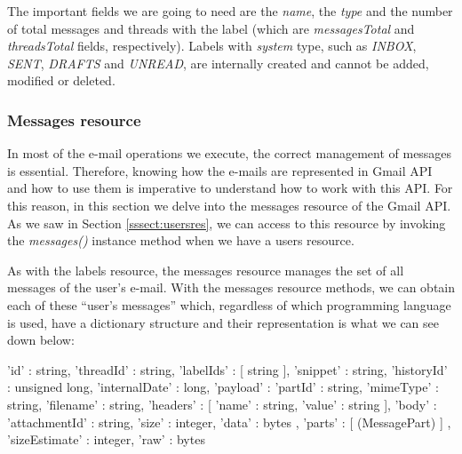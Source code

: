 The important fields we are going to need are the \textit{name}, the \textit{type} and the number of total messages and threads with the label (which are \textit{messagesTotal} and \textit{threadsTotal} fields, respectively). Labels with \textit{system} type, such as \textit{INBOX}, \textit{SENT}, \textit{DRAFTS} and \textit{UNREAD}, are internally created and cannot be added, modified or deleted.

\subsubsection{Messages resource}\label{sssect:msgres}
In most of the e-mail operations we execute, the correct management of messages is essential. Therefore, knowing how the e-mails are represented in Gmail API and how to use them is imperative to understand how to work with this API. For this reason, in this section we  delve into the messages resource \citep[/v1/reference/users/messages]{gmailAPI} of the Gmail API. As we saw in Section \ref{sssect:usersres}, we can access to this resource by invoking the \textit{messages()} instance method when we have a users resource.

As with the labels resource, the messages resource manages the set of all messages of the user's e-mail. With the messages resource methods, we can obtain each of these ``user's messages'' which, regardless of which programming language is used, have a dictionary structure and their representation is what we can see down below:

\begin{python}
	{
		'id' : string,
		'threadId' : string,
		'labelIds' : [ string ],
		'snippet' : string,
		'historyId' : unsigned long,
		'internalDate' : long,
		'payload' : {
			'partId' : string,
			'mimeType' : string,
			'filename' : string,
			'headers' : [
			{
				'name' : string,
				'value' : string
			}
			],
			'body' : {
				'attachmentId' : string,
				'size' : integer,
				'data' : bytes
			},
			'parts' : [ (MessagePart) ]
		},
		'sizeEstimate' : integer,
		'raw' : bytes
	}
\end{python}

